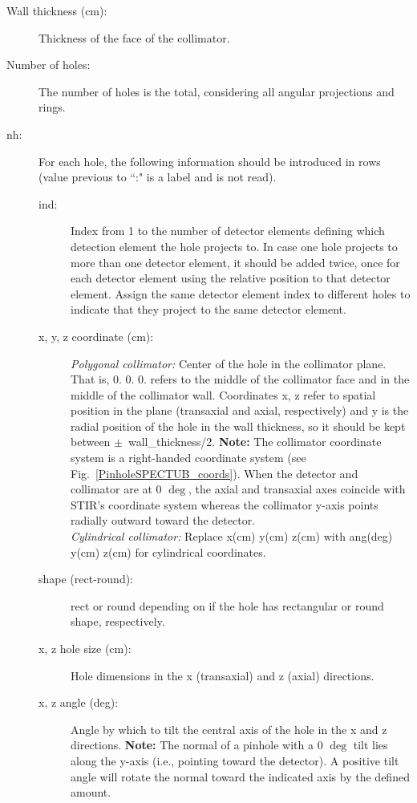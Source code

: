 \documentclass{article}
\begin{document}
{{{{{{\begin{description}
\item[Wall thickness (cm):] Thickness of the face of the collimator.

\item[Number of holes:] The number of holes is the total, considering all angular projections and rings. 

\item[nh:] For each hole, the following information should be introduced in rows (value previous to ``:" is a label and is not read).

\begin{description}

\item[ind:] Index from 1 to the number of detector elements defining which detection element the hole projects to. In case one hole projects to more than one detector element, it should be added twice, once for each detector element using the relative position to that detector element. Assign the same detector element index to different holes to indicate that they project to the same detector element.

\item[x, y, z coordinate (cm):] \textit{Polygonal collimator:} Center of the hole in the collimator plane. That is, 0. 0. 0. refers to the middle of the collimator face and in the middle of the collimator wall. Coordinates x, z refer to spatial position in the plane (transaxial and axial, respectively) and y is the radial position of the hole in the wall thickness, so it should be kept between $\pm$~wall\_thickness/2. \textbf{Note:} The collimator coordinate system is a right-handed coordinate system (see Fig.~\ref{PinholeSPECTUB_coords}). When the detector and collimator are at 0 $\mathrm{\deg}$, the axial and transaxial axes coincide with STIR's coordinate system whereas the collimator y-axis points radially outward toward the detector. \\ \textit{Cylindrical collimator:} Replace x(cm) y(cm) z(cm) with ang(deg) y(cm) z(cm) for cylindrical coordinates. 

\item[shape (rect-round):] rect or round depending on if the hole has rectangular or round shape, respectively.

\item[x, z hole size (cm):] Hole dimensions in the x (transaxial) and z (axial) directions.

\item[x, z angle (deg):] Angle by which to tilt the central axis of the hole in the x and z directions. \textbf{Note:} The normal of a pinhole with a 0 $\mathrm{\deg}$ tilt lies along the y-axis (i.e., pointing toward the detector). A positive tilt angle will rotate the normal toward the indicated axis by the defined amount.


\end{description}
\end{description}}}}}}}
\end{document}
